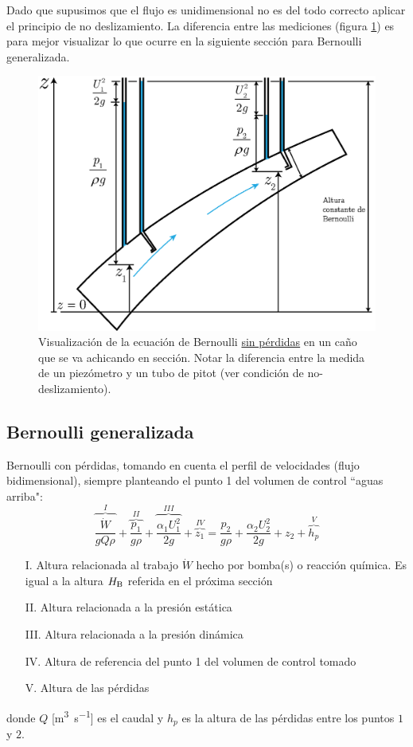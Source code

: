 Dado que supusimos que el flujo es unidimensional no es del todo correcto aplicar el principio de no deslizamiento. La diferencia entre las mediciones (figura \ref{fig:diagramaBernoulli}) es para mejor visualizar lo que ocurre en la siguiente sección para Bernoulli generalizada. 

\begin{figure}
    \centering
    \includegraphics[width=.5\textwidth]{fig/bernoullidiag.eps}
    \caption{Visualización de la ecuación de Bernoulli \underline{sin pérdidas} en un caño que se va achicando en sección. Notar la diferencia entre la medida de un piezómetro y un tubo de pitot (ver condición de no-deslizamiento).}
    \label{fig:diagramaBernoulli}
\end{figure}
\subsection{Bernoulli generalizada}
Bernoulli con pérdidas, tomando en cuenta el perfil de velocidades (flujo bidimensional), siempre planteando el punto 1 del volumen de control ``aguas arriba":
\begin{equation}\label{eq:bernoulliPerdidas}
    \overbrace{\frac{\dot{W}}{gQ\rho}}^{I}+\overbrace{\frac{p_1}{g\rho}}^{II}+\overbrace{\frac{\alpha_1 U_1^2}{2g}}^{III}+\overbrace{z_1}^{IV}=\frac{p_2}{g\rho}+\frac{\alpha_2 U_2^2}{2g}+z_2+\overbrace{h_p}^{V}
\end{equation}
\begin{itemize}
    \item[I.] Altura relacionada al trabajo $\dot{W}$ hecho por bomba(s) o reacción química. Es igual a la altura $H_{\RM{B}}$ referida en el próxima sección
    \item[II.] Altura relacionada a la presión estática
    \item[III.] Altura relacionada a la presión dinámica
    \item[IV.] Altura de referencia del punto 1 del volumen de control tomado
    \item[V.] Altura de las pérdidas
\end{itemize}
donde $Q$ [\si{\meter \cubed \per \second}] es el caudal y $h_p$ es la altura de las pérdidas entre los puntos $1$ y $2$. 
